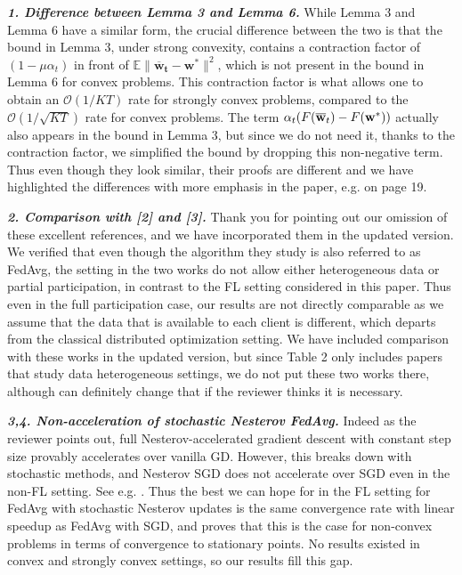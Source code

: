 \documentclass{article}
\newcommand{\ov}[1]{{\overline{\mathbf{#1}}}}
\begin{document}
\textbf{\textit{1. Difference between Lemma 3 and Lemma 6.}}
While Lemma 3 and Lemma 6 have a similar form, the crucial difference between the two is that the bound in Lemma 3, under strong convexity, contains a contraction factor of $(1-\mu \alpha_t)$ in front of $\mathbb{E}\|\mathbf{\overline{\mathbf{w}}_{t}-\mathbf{w}^{*}}\|^2$, which is not present in the bound in Lemma 6 for convex problems. This contraction factor is what allows one to obtain an $\mathcal{O}(1/KT)$ rate for strongly convex problems, compared to the $\mathcal{O}(1/\sqrt{KT})$ rate for convex problems. The term $\alpha_{t}(F(\ov{w}_{t})-F(\vw^{\ast}))$ actually also appears in the bound in Lemma 3, but since we do not need it, thanks to the contraction factor, we simplified the bound by dropping this non-negative term. Thus even though they look similar, their proofs are different and we have highlighted the differences with more emphasis in the paper, e.g. on page 19. 

\textbf{\textit{2. Comparison with [2] and [3].}}
Thank you for pointing out our omission of these excellent references, and we have incorporated them in the updated version. We verified that even though the algorithm they study is also referred to as FedAvg, the setting in the two works do not allow either heterogeneous data or partial participation, in contrast to the FL setting considered in this paper. Thus even in the full participation case, our results are not directly comparable as we assume that the data that is available to each client is different, which departs from the classical distributed optimization setting. We have included comparison with these works in the updated version, but since Table 2 only includes papers that study data heterogeneous settings, we do not put these two works there, although can definitely change that if the reviewer thinks it is necessary.

\textbf{\textit{3,4. Non-acceleration of stochastic Nesterov FedAvg.}}
Indeed as the reviewer points out, full Nesterov-accelerated gradient descent with constant step size provably accelerates over vanilla GD. However, this breaks down with stochastic methods, and Nesterov SGD does not accelerate over SGD even in the non-FL setting. See e.g. \cite{kidambi2018insufficiency,liu2018accelerating,yuan2020federated}. Thus the best we can hope for in the FL setting for FedAvg with stochastic Nesterov updates is the same convergence rate with linear speedup as FedAvg with SGD, and \cite{yu2019linear} proves that this is the case for non-convex problems in terms of convergence to stationary points. No results existed in convex and strongly convex settings, so our results fill this gap.
\end{document}

